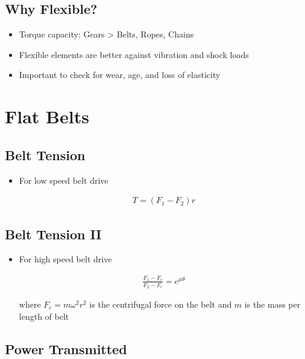 \documentclass[
10pt,
a4paper,
openany,
svgnames,
]{book}
\begin{document}
\subsection*{Why Flexible?}
\label{sec:org096c07e}

\begin{itemize}
\item Torque capacity: Gears > Belts, Ropes, Chains
\item Flexible elements are better against vibration and shock loads
\item Important to check for wear, age, and loss of elasticity
\end{itemize}

\section*{Flat Belts}
\label{sec:org5db3418}

\subsection*{Belt Tension}
\label{sec:org73f10c2}

\begin{itemize}
\item For low speed belt drive

\begin{align*}
    T = \left( F_1 - F_2 \right) r
\end{align*}
\end{itemize}

\subsection*{Belt Tension II}
\label{sec:org406bd0f}

\begin{itemize}
\item For high speed belt drive

\begin{align*}
    \frac{F_1 - F_c}{F_2 - F_c} = e^{\mu \theta}
\end{align*}

where \(F_c = m \omega^2 r^2\) is the centrifugal force on the belt
and \(m\) is the mass per length of belt
\end{itemize}

\subsection*{Power Transmitted}
\label{sec:orge75d272}
\end{document}
